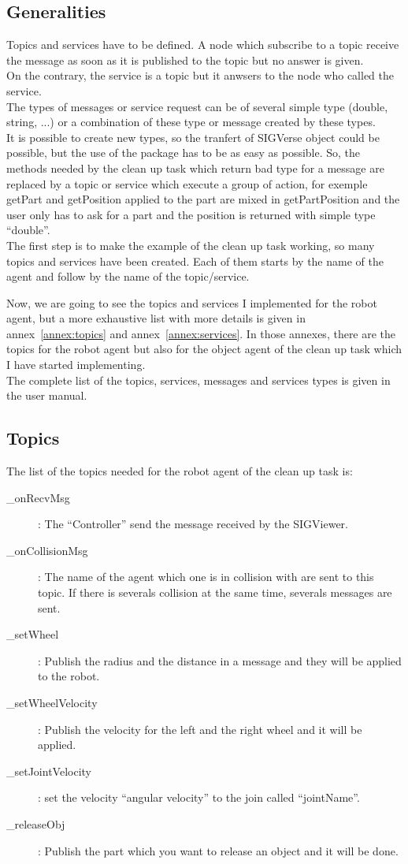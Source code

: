 \subsection{Generalities}
Topics and services have to be defined. A node which subscribe to a topic receive the message as soon as it is published to the topic but no answer is given.\\
On the contrary, the service is a topic but it anwsers to the node who called the service.\\
The types of messages or service request can be of several simple type (double, string, ...) or a combination of these type or message created by these types.\\
It is possible to create new types, so the tranfert of SIGVerse object could be possible, but the use of the package has to be as easy as possible. So, the methods needed by the clean up task which return bad type for a message are replaced by a topic or service which execute a group of action, for exemple getPart and getPosition applied to the part are mixed in getPartPosition and the user only has to ask for a part and the position is returned with simple type ``double''.\\

The first step is to make the example of the clean up task working, so many topics and services have been created. Each of them starts by the name of the agent and follow by the name of the topic/service.

Now, we are going to see the topics and services I implemented for the robot agent, but a more exhaustive list with more details is given in annex~\ref{annex:topics} and annex~\ref{annex:services}. In those annexes, there are the topics for the robot agent but also for the object agent of the clean up task which I have started implementing.\\
The complete list of the topics, services, messages and services types is given in the user manual.

\subsection{Topics}
The list of the topics needed for the robot agent of the clean up task is:
\begin{description}
	\item[\_onRecvMsg] : The ``Controller'' send the message received by the SIGViewer.
	\item[\_onCollisionMsg] : The name of the agent which one is in collision with are sent to this topic. If there is severals collision at the same time, severals messages are sent.
	\item[\_setWheel] : Publish the radius and the distance in a message and they will be applied to the robot.
	\item[\_setWheelVelocity] : Publish the velocity for the left and the right wheel and it will be applied.
	\item[\_setJointVelocity] : set the velocity ``angular velocity'' to the join called ``jointName''.
	\item[\_releaseObj]: Publish the part which you want to release an object and it will be done.
\end{description}

